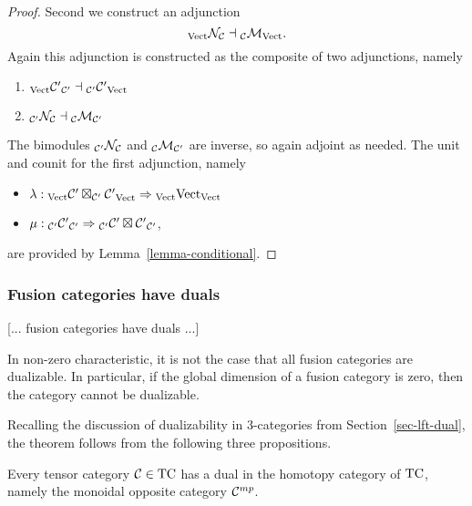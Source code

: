 \documentclass{amsart}
\begin{document}
\begin{proof}
Second we construct an adjunction
$${}_{\mathrm{Vect}} {\mathcal N}_{\mathcal C} \dashv {}_{\mathcal C} {\mathcal M}_{\mathrm{Vect}}.$$
Again this adjunction is constructed as the composite of two adjunctions, namely
\begin{enumerate}
\item ${}_{\mathrm{Vect}} {\mathcal C'}_{\mathcal C'} \dashv {}_{\mathcal C'} {\mathcal C'}_{\mathrm{Vect}}$
\item ${}_{\mathcal C'} {\mathcal N}_{\mathcal C} \dashv {}_{\mathcal C} {\mathcal M}_{\mathcal C'}$
\end{enumerate}
The bimodules ${}_{\mathcal C'} {\mathcal N}_{\mathcal C}$ and ${}_{\mathcal C} {\mathcal M}_{\mathcal C'}$ are inverse, so again adjoint as needed.  The unit and counit for the first adjunction, namely
\begin{itemize}
\item[] $\lambda : {}_{\mathrm{Vect}} {\mathcal C' \boxtimes_{\mathcal C'} \mathcal C'}_{\mathrm{Vect}} \Rightarrow {}_{\mathrm{Vect}} {\mathrm{Vect}}_{\mathrm{Vect}}$
\item[] $\mu : {}_{\mathcal C'} {\mathcal C'}_{\mathcal C'} \Rightarrow {}_{\mathcal C'} {\mathcal C' \boxtimes \mathcal C'}_{\mathcal C'}$,
\end{itemize}
are provided by Lemma~\ref{lemma-conditional}.
\end{proof}


     
\subsubsection{Fusion categories have duals} \label{sec-df-categories}

\begin{theorem} \label{thm-fcd}
[... fusion categories have duals ...]
\end{theorem}


\begin{remark}
In non-zero characteristic, it is not the case that all fusion categories are dualizable.  In particular, if the global dimension of a fusion category is zero, then the category cannot be dualizable.
\end{remark}

Recalling the discussion of dualizability in 3-categories from Section~\ref{sec-lft-dual}, the theorem follows from the following three propositions.

\begin{proposition}
Every tensor category $\mathcal C \in \mathrm{TC}$ has a dual in the homotopy category of $\mathrm{TC}$, namely the monoidal opposite category $\mathcal C^{mp}$.
\end{proposition}
\end{document}
